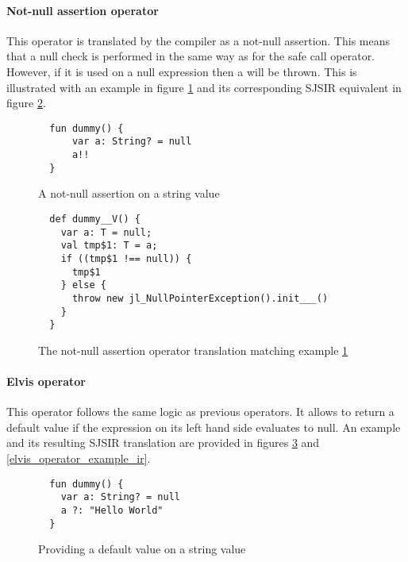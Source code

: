 \paragraph{Not-null assertion operator \ktinline{!!}} This operator is translated by the compiler 
as a not-null assertion. This means that a null check is performed in the same way as for the safe 
call operator. However, if it is used on a null expression then a  will be 
thrown. This is illustrated with an example in figure \ref{npe_assertion} and its corresponding SJSIR equivalent in figure \ref{npe_assertion_ir}.


\begin{figure}[H]
  \begin{verbatim}
  fun dummy() {
      var a: String? = null
      a!!
  }
  \end{verbatim}
  \caption{A not-null assertion on a string value}
  \label{npe_assertion}
\end{figure}


\begin{figure}[H]
  \begin{verbatim}
  def dummy__V() {
    var a: T = null;
    val tmp$1: T = a;
    if ((tmp$1 !== null)) {
      tmp$1
    } else {
      throw new jl_NullPointerException().init___()
    }
  }
  \end{verbatim}
  \caption{The not-null assertion operator translation matching example \ref{npe_assertion}}
  \label{npe_assertion_ir}
\end{figure}

\paragraph{Elvis operator } This operator follows the same logic as previous 
operators. It allows to return a default value if the expression on its left hand side 
evaluates to null. An example and its resulting SJSIR translation are provided in figures \ref{elvis_operator_example} and \ref{elvis_operator_example_ir}.

\begin{figure}[H]
  \begin{verbatim}
  fun dummy() {
    var a: String? = null
    a ?: "Hello World"
  }
  \end{verbatim}
  \caption{Providing a default value on a string value}
  \label{elvis_operator_example}
\end{figure}

